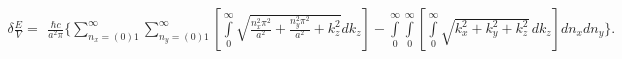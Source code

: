 \documentclass[twoside, 10pt]{article}
\begin{document}
\vspace{-3.5mm}
    \begin{equation} \label{eq:2}
\begin{array}{lr}
\delta \frac{E}{V} =
\begin{array}{c}
\frac{\hbar c}{a^2 \pi}\Bigg\{\sum\limits_{n_x=(0)1}^{\infty}\sum\limits_{n_y=(0)1}^{\infty}\left[\int\limits_{0}^{\infty}\sqrt{\frac{n_x^2 \pi^2}{a^2}+\frac{n_y^2 \pi^2}{a^2}+k_z^2} dk_z\right] %
-\int\limits_{0}^{\infty}\int\limits_{0}^{\infty}\left[\int\limits_{0}^{\infty}\sqrt{k_x^2+k_y^2+k_z^2}\,dk_z\right] dn_x dn_y\Bigg\}.
\end{array}\end{array}\end{equation}
\vspace{-3.5mm}
\end{document}
